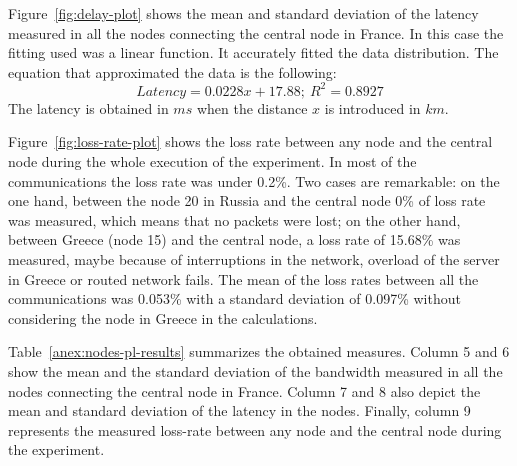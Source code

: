 Figure~\ref{fig:delay-plot} shows the mean and standard
deviation of the latency measured in all the nodes connecting the central node
in France. In this case the fitting used was a linear function. It accurately fitted the data distribution. The equation that approximated the data is the following:
\begin{equation}\label{eq:latency_fitting}
Latency=0.0228x+17.88;~R^2=0.8927
\end{equation}
The latency is obtained in $ms$ when the distance $x$ is introduced in $km$.

Figure~\ref{fig:loss-rate-plot} shows the loss rate between any node and the central node during the whole execution of the experiment. In most of the communications the loss rate was under 0.2\%. Two cases are remarkable: on the one hand, between the node 20 in Russia and the central node 0\% of loss rate was measured, which means that no packets were lost; on the other hand, between Greece (node 15) and the central node, a loss rate of 15.68\% was measured, maybe because of interruptions in the network, overload of the server in Greece or routed network fails. The mean of the loss rates between all the communications was 0.053\% with a standard deviation of 0.097\% without considering the node in Greece in the calculations.

Table~\ref{anex:nodes-pl-results} summarizes the obtained measures. Column 5 and 6 show the mean and
the standard deviation of the bandwidth measured in all the nodes connecting the
central node in France. Column 7 and 8 also depict the mean and standard
deviation of the latency in the nodes. Finally, column 9 represents the measured
loss-rate between any node and the central node during the experiment.
